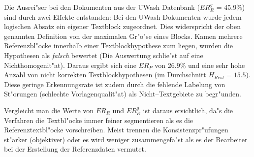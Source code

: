 Die Ausrei"ser bei den Dokumenten aus der UWash Datenbank ($ER_{R}^{g}$ = 45.9\%) 
sind durch zwei Effekte entstanden:
Bei den UWash Dokumenten wurde jedem logischen Absatz ein eigener Textblock zugeordnet. Dies
widerspricht der oben genannten Definition von der maximalen Gr"o"se eines Blocks.
Kamen mehrere Referenzbl"ocke innerhalb einer Textblockhypothese zum liegen, wurden die Hypothesen
als {\em falsch\/} bewertet (Die Auswertung schlie"st auf eine Nichthomogenit"at). Daraus
ergibt sich eine $ER_{P}$ von 26.9\% und eine sehr hohe Anzahl von
nicht korrekten Textblockhypothesen (im Durchschnitt $H_{Rest} = 15.5$). Diese geringe
Erkennungsrate ist zudem durch die fehlende Labelung von St"orungen (schlechte Vorlagenqualit"at)
als Nicht--Textgebiete zu begr"unden.

Vergleicht man die Werte von $ER_{R}$ und $ER_{R}^{g}$  ist daraus ersichtlich, da"s
die Verfahren die Textbl"ocke immer feiner segmentieren als es die Referenztextbl"ocke
vorschreiben. Meist trennen die Konsistenzpr"ufungen st"arker (objektiver) oder es wird weniger
zusammengefa"st als es der Bearbeiter bei der Erstellung der Referenzdaten
vermutet.

